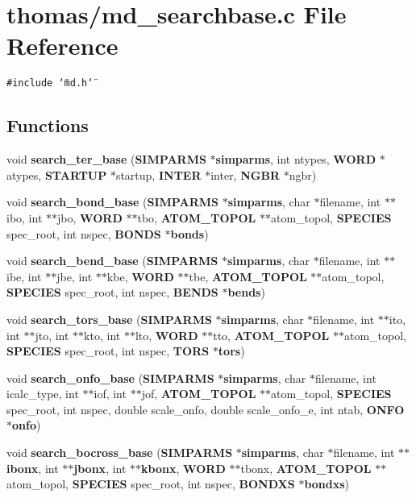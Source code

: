 \section{thomas/md\_\-searchbase.c File Reference}
\label{thomas_2md__searchbase_8c}
{\tt \#include \char`\"{}md.h\char`\"{}}\par
\subsection*{Functions}
\begin{CompactItemize}
\item 
void {\bf search\_\-ter\_\-base} ({\bf SIMPARMS} $\ast${\bf simparms}, int ntypes, {\bf WORD} $\ast$atypes, {\bf STARTUP} $\ast$startup, {\bf INTER} $\ast$inter, {\bf NGBR} $\ast$ngbr)
\item 
void {\bf search\_\-bond\_\-base} ({\bf SIMPARMS} $\ast${\bf simparms}, char $\ast$filename, int $\ast$$\ast$ibo, int $\ast$$\ast$jbo, {\bf WORD} $\ast$$\ast$tbo, {\bf ATOM\_\-TOPOL} $\ast$$\ast$atom\_\-topol, {\bf SPECIES} spec\_\-root, int nspec, {\bf BONDS} $\ast${\bf bonds})
\item 
void {\bf search\_\-bend\_\-base} ({\bf SIMPARMS} $\ast${\bf simparms}, char $\ast$filename, int $\ast$$\ast$ibe, int $\ast$$\ast$jbe, int $\ast$$\ast$kbe, {\bf WORD} $\ast$$\ast$tbe, {\bf ATOM\_\-TOPOL} $\ast$$\ast$atom\_\-topol, {\bf SPECIES} spec\_\-root, int nspec, {\bf BENDS} $\ast${\bf bends})
\item 
void {\bf search\_\-tors\_\-base} ({\bf SIMPARMS} $\ast${\bf simparms}, char $\ast$filename, int $\ast$$\ast$ito, int $\ast$$\ast$jto, int $\ast$$\ast$kto, int $\ast$$\ast$lto, {\bf WORD} $\ast$$\ast$tto, {\bf ATOM\_\-TOPOL} $\ast$$\ast$atom\_\-topol, {\bf SPECIES} spec\_\-root, int nspec, {\bf TORS} $\ast${\bf tors})
\item 
void {\bf search\_\-onfo\_\-base} ({\bf SIMPARMS} $\ast${\bf simparms}, char $\ast$filename, int icalc\_\-type, int $\ast$$\ast$iof, int $\ast$$\ast$jof, {\bf ATOM\_\-TOPOL} $\ast$$\ast$atom\_\-topol, {\bf SPECIES} spec\_\-root, int nspec, double scale\_\-onfo, double scale\_\-onfo\_\-e, int ntab, {\bf ONFO} $\ast${\bf onfo})
\item 
void {\bf search\_\-bocross\_\-base} ({\bf SIMPARMS} $\ast${\bf simparms}, char $\ast$filename, int $\ast$$\ast${\bf ibonx}, int $\ast$$\ast${\bf jbonx}, int $\ast$$\ast${\bf kbonx}, {\bf WORD} $\ast$$\ast$tbonx, {\bf ATOM\_\-TOPOL} $\ast$$\ast$atom\_\-topol, {\bf SPECIES} spec\_\-root, int nspec, {\bf BONDXS} $\ast${\bf bondxs})
\end{CompactItemize}


